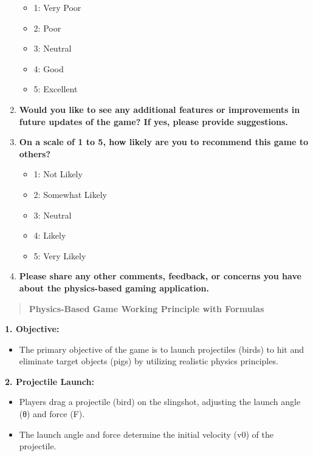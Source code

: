 \documentclass[
]{article}
\begin{document}
\begin{enumerate}
  \begin{itemize}
  \item
    1: Very Poor
  \item
    2: Poor
  \item
    3: Neutral
  \item
    4: Good
  \item
    5: Excellent
  \end{itemize}
\item
  \textbf{Would you like to see any additional features or improvements
  in future updates of the game? If yes, please provide suggestions.}
\item
  \textbf{On a scale of 1 to 5, how likely are you to recommend this
  game to others?}

  \begin{itemize}
  \item
    1: Not Likely
  \item
    2: Somewhat Likely
  \item
    3: Neutral
  \item
    4: Likely
  \item
    5: Very Likely
  \end{itemize}
\item
  \textbf{Please share any other comments, feedback, or concerns you
  have about the physics-based gaming application.}
\end{enumerate}

\begin{quote}
\textbf{Physics-Based Game Working Principle with Formulas}
\end{quote}

\textbf{1. Objective:}

\begin{itemize}
\item
  The primary objective of the game is to launch projectiles (birds) to
  hit and eliminate target objects (pigs) by utilizing realistic physics
  principles.
\end{itemize}

\textbf{2. Projectile Launch:}

\begin{itemize}
\item
  Players drag a projectile (bird) on the slingshot, adjusting the
  launch angle (θ) and force (F).
\item
  The launch angle and force determine the initial velocity
  (v0\hspace{0pt}) of the projectile.
\end{itemize}
\end{document}
